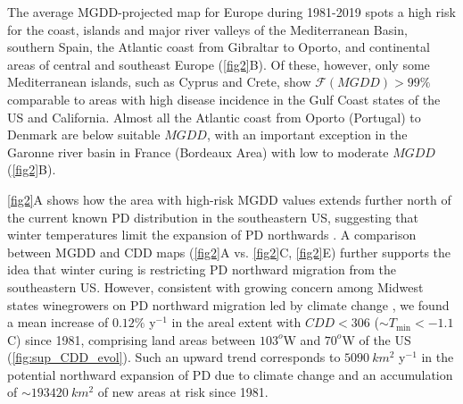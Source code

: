     The average MGDD-projected map for Europe during 1981-2019 spots a high
    risk
    for the coast, islands and major river valleys of the Mediterranean Basin,
    southern Spain, the Atlantic coast from Gibraltar to Oporto, and
    continental
    areas of central and southeast Europe (\cref{fig2}B). Of these, however,
    only
    some Mediterranean islands, such as Cyprus and Crete, show
$\mathcal{F}(MGDD) >
99\%$ comparable to areas with high disease incidence in the Gulf Coast states
    of the US and California. Almost all the Atlantic coast from Oporto
    (Portugal)
    to Denmark are below suitable $MGDD$, with an important exception in the
    Garonne river basin in France (Bordeaux Area) with low to moderate $MGDD$
    (\cref{fig2}B).

    \cref{fig2}A shows how the area with high-risk MGDD values extends further
    north of the current known PD distribution in the southeastern US,
    suggesting
    that winter temperatures limit the expansion of PD northwards
    \cite{Hopkins2002}. A comparison between MGDD and CDD maps (\cref{fig2}A
    vs.
    \cref{fig2}C, \cref{fig2}E) further supports the idea that winter curing is
    restricting PD northward migration from the southeastern US. However,
    consistent with growing concern among Midwest states winegrowers on PD
    northward migration led by climate change \cite{Galvez2010}, we found a
    mean
    increase of $0.12 \%$ y$^{-1}$ in the areal extent with $CDD < 306$ ($\sim
T_{\textrm{min}} < -1.1$ \textdegree C) since 1981, comprising land areas
    between $103^o$W and $70^o$W of the US (\cref{fig:sup_CDD_evol}). Such an
    upward trend corresponds to $\SI{5090}{km^2}$ y$^{-1}$ in the potential
    northward expansion of PD due to climate change and an accumulation of
$\sim\SI{193420}{km^2}$ of new areas at risk since 1981.

